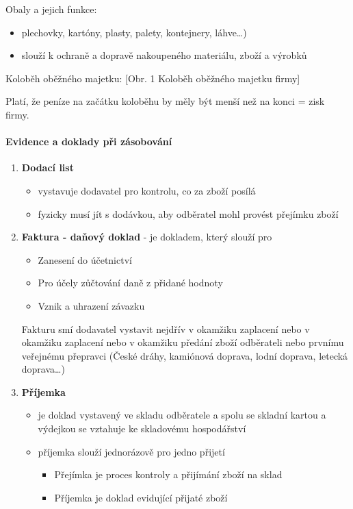 \documentclass[11pt,a4paper,twoside]{book}
\begin{document}
	Obaly a jejich funkce:
	\begin{itemize}
		\item plechovky, kartóny, plasty, palety, kontejnery, láhve\ldots)
		\item slouží k ochraně a dopravě nakoupeného materiálu, zboží a výrobků
	\end{itemize}

	Koloběh oběžného majetku:
	[Obr. 1 Koloběh oběžného majetku firmy]

	Platí, že peníze na začátku koloběhu by měly být menší než na konci = zisk firmy.

	\paragraph*{Evidence a doklady při zásobování}
	\begin{enumerate}
		\item \textbf{Dodací list}
			\begin{itemize}
				\item vystavuje dodavatel pro kontrolu, co za zboží posílá
				\item fyzicky musí jít s dodávkou, aby odběratel mohl provést přejímku zboží
			\end{itemize}
		\item \textbf{Faktura - daňový doklad} - je dokladem, který slouží pro
			\begin{itemize}
				\item Zanesení do účetnictví
				\item Pro účely zůčtování daně z přidané hodnoty
				\item Vznik a uhrazení závazku
			\end{itemize}
			Fakturu smí dodavatel vystavit nejdřív v okamžiku zaplacení nebo v okamžiku zaplacení nebo v okamžiku předání zboží odběrateli nebo prvnímu veřejnému přepravci (České dráhy, kamiónová doprava, lodní doprava, letecká doprava\ldots)
		\item \textbf{Příjemka}
			\begin{itemize}
				\item je doklad vystavený ve skladu odběratele a spolu se skladní kartou a výdejkou se vztahuje ke skladovému hospodářství
				\item příjemka slouží jednorázově pro jedno přijetí
					\begin{itemize}
						\item Přejímka je proces kontroly a přijímání zboží na sklad
						\item Příjemka je doklad evidující přijaté zboží

\end{itemize}
\end{itemize}
\end{enumerate}
\end{document}
